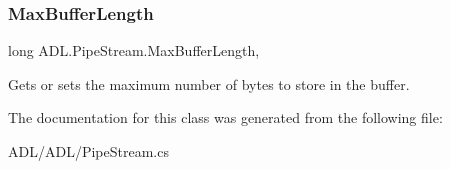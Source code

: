 \subsubsection{\texorpdfstring{Max\+Buffer\+Length}{MaxBufferLength}}
{\footnotesize\ttfamily long A\+D\+L.\+Pipe\+Stream.\+Max\+Buffer\+Length\hspace{0.3cm}{\ttfamily [get]}, {\ttfamily [set]}}



Gets or sets the maximum number of bytes to store in the buffer. 



The documentation for this class was generated from the following file\+:\begin{DoxyCompactItemize}
\item 
A\+D\+L/\+A\+D\+L/Pipe\+Stream.\+cs\end{DoxyCompactItemize}

